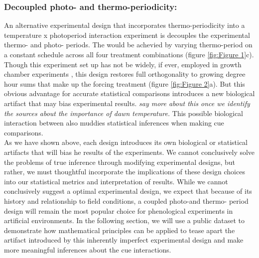 \documentclass[12pt]{article}\usepackage[]{graphicx}\usepackage[]{color}
\begin{document}
\subsubsection*{Decoupled photo- and thermo-periodicity:}
 \indent \indent An alternative experimental design that incorporates thermo-periodicity into a temperature x photoperiod interaction experiment is decouples the experimental thermo- and photo- periods. The would be achevied by varying thermo-period on a constant schedule across all four treatment combinations (figure \ref{fig:Figure 1}c). Though this experiment set up has not be widely, if ever, employed in growth chamber experiments \citep{Ettinger_inprep}, this design restores full orthogonality to growing degree hour sums that make up the forcing treatment (figure \ref{fig:Figure 2}a). But this obvious advantage for accurate statistical comparisons introduces a new biological artifact that may bias experimental results. \textit{say more about this once we identify the sources about the importance of dawn temperature.} This possible biological interaction between also muddies statistical inferences when making cue comparisons.\\
 
 \indent As we have shown above, each design introduces its own biological or statistical artifacts that will bias he results of the experiments. We cannot conclusively solve the problems of true inference through modifying experimental designs, but rather, we must thoughtful incorporate the implications of these design choices into our statistical metrics and interpretation of results. While we cannot conclusively suggest a optimal experimental design, we expect that because of its history and relationship to field conditions, a coupled photo-and thermo- period design will remain the most popular choice for phenological experiments in artificial environments. In the following section, we will use a public dataset to demonstrate how mathematical principles can be applied to tease apart the artifact introduced by this inherently imperfect experimental design and make more meaningful inferences about the cue interactions. 
\end{document}
